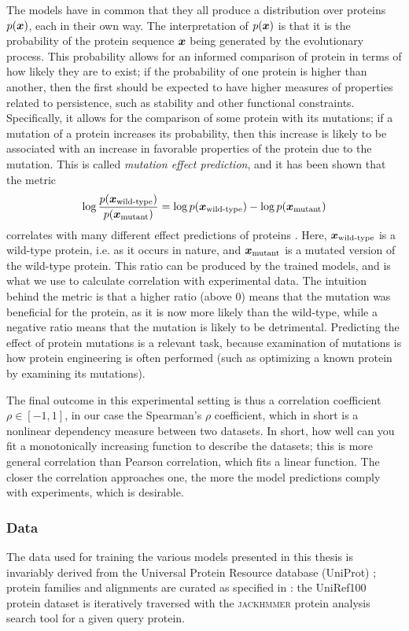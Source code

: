 The models have in common that they all produce a distribution over proteins $p(\bm{ x })$, each in their own way. The interpretation of $p(\bm{ x })$ is that it is the probability of the protein sequence $\bm{ x }$ being generated by the evolutionary process. This probability allows for an informed comparison of protein in terms of how likely they are to exist; if the probability of one protein is higher than another, then the first should be expected to have higher measures of properties related to persistence, such as stability and other functional constraints. Specifically, it allows for the comparison of some protein with its mutations; if a mutation of a protein increases its probability, then this increase is likely to be associated with an increase in favorable properties of the protein due to the mutation. This is called \textit{mutation effect prediction}, and it has been shown that the metric
\begin{equation}
\log \frac{p(\bm{ x }_{\text{wild-type}})}{p(\bm{ x }_{\text{mutant}})} = \log p(\bm{ x }_{\text{wild-type}}) - \log p(\bm{ x }_{\text{mutant}}) \label{eq:prediction_metric}   
\end{equation}
correlates with many different effect predictions of proteins \cite{hopf2017mutation}. Here, $\bm{ x }_{\text{wild-type}}$ is a wild-type protein, i.e. as it occurs in nature, and $\bm{ x }_{\text{mutant}}$ is a mutated version of the wild-type protein. This ratio can be produced by the trained models, and is what we use to calculate correlation with experimental data. The intuition behind the metric is that a higher ratio (above 0) means that the mutation was beneficial for the protein, as it is now more likely than the wild-type, while a negative ratio means that the mutation is likely to be detrimental. Predicting the effect of protein mutations is a relevant task, because examination of mutations is how protein engineering is often performed (such as optimizing a known protein by examining its mutations).

The final outcome in this experimental setting is thus a correlation coefficient $\rho \in [-1, 1]$, in our case the Spearman's $\rho$ coefficient, which in short is a nonlinear dependency measure between two datasets. In short, how well can you fit a monotonically increasing function to describe the datasets; this is more general correlation than Pearson correlation, which fits a linear function. The closer the correlation approaches one, the more the model predictions comply with experiments, which is desirable.

\subsubsection{Data}
\label{sec:data}
The data used for training the various models presented in this thesis is invariably derived from the Universal Protein Resource database (UniProt) \cite{uniprot2007universal}; protein families and alignments are curated as specified in \textcite{riesselman2018deep}: the UniRef100 protein dataset is iteratively traversed with the 
\textsc{jackhmmer} protein analysis search tool \cite{eddy1992hmmer} for a given query protein.

